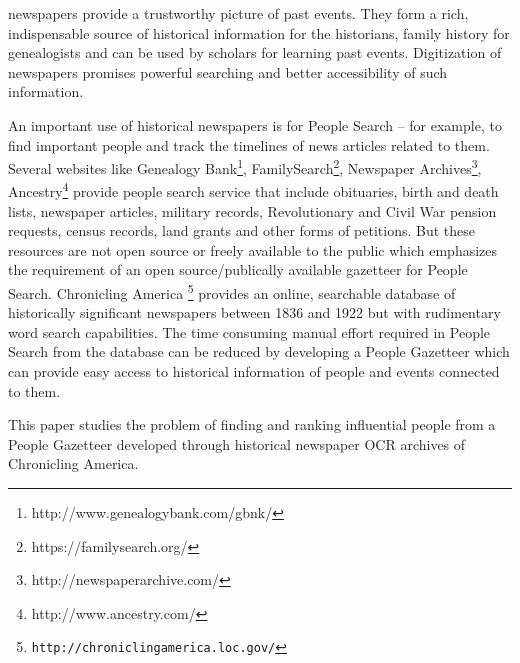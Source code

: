 \documentclass[10pt,journal,compsoc]{IEEEtran}
\begin{document}
% 
% 
% 
% 
newspapers provide a trustworthy picture of past events. They form a rich, indispensable source of historical information for the historians\cite{allen2010historians}, family history for genealogists and can be used by scholars for learning past events. Digitization of newspapers promises powerful searching and better accessibility of such information\cite{yang2011topic}.

An important use of historical newspapers is for People Search\cite{BilenkoMCRF03,Friedman_92} -- for example, to find important people and track the timelines of news articles related to them. Several websites like Genealogy Bank\footnote{http://www.genealogybank.com/gbnk/}, FamilySearch\footnote{https://familysearch.org/}, Newspaper Archives\footnote{http://newspaperarchive.com/}, Ancestry\footnote{http://www.ancestry.com/} provide people search service that include obituaries, birth and death lists, newspaper articles, military records, Revolutionary and Civil War pension requests, census records, land grants and other forms of petitions. 
But these resources are not open source or freely available to the public which emphasizes the requirement of an open source/publically available gazetteer for People Search. Chronicling America \footnote{\texttt{http://chroniclingamerica.loc.gov/}} provides an online, searchable database of historically significant newspapers between 1836 and 1922 but with rudimentary word search capabilities. The time consuming manual effort required in People Search from the database can be reduced by developing a People Gazetteer which can provide easy access to historical information of people and events connected to them.


This paper studies the problem of finding and ranking influential people from a People Gazetteer developed through historical newspaper OCR archives of Chronicling America.
  
\end{document}
